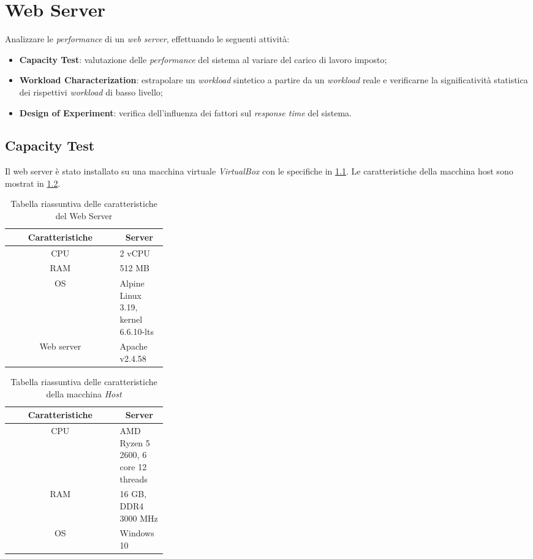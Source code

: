 \chapter{Web Server}

Analizzare le \textit{performance} di un \textit{web server}, effettuando le seguenti
attività:
\begin{itemize}
    \item \textbf{Capacity Test}: valutazione delle \textit{performance} del sistema al
    variare del carico di lavoro imposto;
    \item \textbf{Workload Characterization}: estrapolare un \textit{workload} sintetico
    a partire da un \textit{workload} reale e verificarne la significatività
    statistica dei rispettivi \textit{workload} di basso livello;
    \item \textbf{Design of Experiment}: verifica dell’influenza dei fattori sul
    \textit{response time} del sistema.
\end{itemize}

\section{Capacity Test}

Il web server è stato installato su una macchina virtuale \textit{VirtualBox} con le specifiche in \cref{tab:web_server_specs}. Le caratteristiche della macchina host sono mostrat in \cref{tab:host_specs}.

\begin{table}[H]
\centering
    \begin{tabular}{|c|p{0.3\linewidth}|}
    \hline
    \multicolumn{1}{|c|}{\textbf{Caratteristiche}} &
    \multicolumn{1}{c|}{\textbf{Server}}
    \tabularnewline \hline

CPU & 2 vCPU \tabularnewline \hline

RAM & 512 MB\tabularnewline \hline

OS & Alpine Linux 3.19, kernel 6.6.10-lts \tabularnewline \hline

Web server & Apache v2.4.58 \tabularnewline \hline
\end{tabular}
\caption{Tabella riassuntiva delle caratteristiche del Web Server}
\label{tab:web_server_specs}
\end{table}

\begin{table}[H]
\centering
    \begin{tabular}{|c|p{0.3\linewidth}|}
    \hline
    \multicolumn{1}{|c|}{\textbf{Caratteristiche}} &
    \multicolumn{1}{c|}{\textbf{Server}}
    \tabularnewline \hline

CPU & AMD Ryzen 5 2600, 6 core 12 threads \tabularnewline \hline

RAM & 16 GB, DDR4 3000 MHz\tabularnewline \hline

OS & Windows 10 \tabularnewline \hline
\end{tabular}
\caption{Tabella riassuntiva delle caratteristiche della macchina \textit{Host}}
\label{tab:host_specs}
\end{table}

